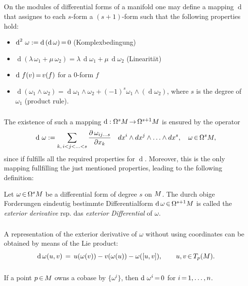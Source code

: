 \documentclass[11pt,twoside]{article}
\begin{document}
\subparagraph{}
On the modules of differential forms of a manifold
one may define a mapping $\operatorname{d}$
that assignes to each $s$-form a $(s+1)$-form
such that
the following properties hold:

\begin{itemize}[leftmargin=15pt]
\item[1.]
$\operatorname{d}^2 \, \omega
:=
\operatorname{d} \, (\operatorname{d}\omega ) {\,=\,} 0$
(Komplexbedingung)
\item[2.]
$\operatorname{d}(\lambda \, \omega_1 + \mu \, \omega_2) =
  \lambda \, \operatorname{d} \omega_1 + \mu \, \operatorname{d} \omega_2$
(Linearit\"at)
\item[3.]
$\operatorname{d} \, f(v) {\,=\,} v(f)$ for a 0-form $f$
\item[4.]
$\operatorname{d} (\omega_1 \wedge \omega_2) =
 \operatorname{d}  \omega_1 \wedge \omega_2  +
 (-1)^s
                   \omega_1 \wedge (\operatorname{d} \omega_2)$,
where $s$ is the degree of $\omega_1$ (product rule).
\end{itemize}

\subparagraph{}
The existence of such a mapping
$\operatorname{d}:\Omega^s {M} {\,\to\,} \Omega^{s+1} {M}$
is ensured by the operator
\[
\operatorname{d} \, \omega := \sum_{k, \, i < j < \ldots < s}
\frac{\partial \, \omega_{ij\ldots s}}{\partial x_k} \quad
dx^i \wedge dx^j \wedge \ldots \wedge dx^s,
\quad \omega {\,\in\,} \Omega^s {M},
\]
since if fulfills all the required properties for $\operatorname{d}$.
Moreover,
this is the only mapping fullfilling the just mentioned properties,
leading to the following definition:

\begin{definition}
Let $\omega {\,\in\,} \Omega^s {M}$ be a differential form of degree $s$
on ${M}$.
The durch obige Forderungen eindeutig bestimmte Differentialform
$\operatorname{d} \omega {\,\in\,} \Omega^{s+1} {M}$
is called the \textit{exterior derivative} rsp. das
\textit{exterior Differential} of $\omega$.
\end{definition}

\subparagraph{}
A representation of the exterior derivative of $\omega$
without using coordinates can be obtained by means of the Lie product:
\[
\operatorname{d} \omega(u,v) \,=\, u(\omega(v)) - v(\omega(u)) - \omega([u,v]),
\qquad u,v {\,\in\,} T_p({M}).
\]

\subparagraph{}
If a point $p {\,\in\,} {M}$ owns a cobase
by $\{\omega^i\}$,
then $\operatorname{d} \, \omega^i {\,=\,} 0$ for $i {\,=\,} 1,\ldots,n$.
\end{document}
